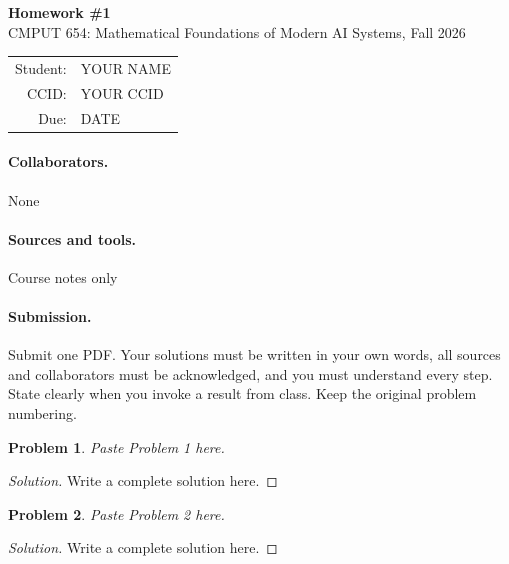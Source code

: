 \documentclass[11pt]{article}
\newcommand{\coursename}{CMPUT 654: Mathematical Foundations of Modern AI Systems}
\newcommand{\term}{Fall 2026}
\newcommand{\hwnumber}{1}
\newcommand{\duedate}{DATE}
\newcommand{\studentname}{YOUR NAME}
\newcommand{\studentccid}{YOUR CCID}
\newcommand{\collaborators}{None}
\newcommand{\sourcesused}{Course notes only}
\theoremstyle{courseproblem}
\newtheorem{problem}{Problem}
\newenvironment{solution}
  {\begin{proof}[Solution]}
  {\end{proof}}
\begin{document}
\begin{center}
  {\Large\bfseries Homework \#\hwnumber}\\[0.3em]
  {\coursename, \term}\\[0.8em]
  \begin{tabular}{rl}
    Student: & \studentname\\
    CCID: & \studentccid\\
    Due: & \duedate
  \end{tabular}
\end{center}

\paragraph{Collaborators.} \collaborators

\paragraph{Sources and tools.} \sourcesused

\paragraph{Submission.}
Submit one PDF. Your solutions must be written in your own words, all sources and
collaborators must be acknowledged, and you must understand every step. State
clearly when you invoke a result from class. Keep the original problem numbering.


\begin{problem}
Paste Problem 1 here.
\end{problem}

\begin{solution}
Write a complete solution here.
\end{solution}

\begin{problem}
Paste Problem 2 here.
\end{problem}

\begin{solution}
Write a complete solution here.
\end{solution}
\end{document}
